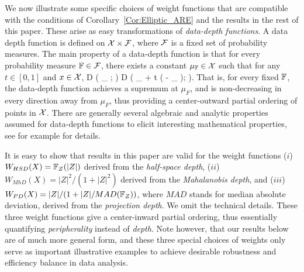 We now illustrate some specific choices of weight functions that are compatible with the 
conditions of Corollary~\ref{Cor:Elliptic_ARE} and the results in the rest of this paper.
 These arise as easy transformations 
of \textit{data-depth functions}. A data depth function 
is defined on $\mathcal{X} \times \mathcal{F}$, where $\mathcal{F}$ is  a fixed set of probability measures.
The main property of a data-depth function is that for every probability measure 
${\mathbb{F}} \in \mathcal{F}$, there exists a constant 
$\mu_{{\mathbb{F}}} \in  \mathcal{X}$ such that for any $t \in [ 0, 1]$ and $x \in \mathcal{X}$,
\baq 
D ( \mu_{\BF} ; \BF ) \geq D ( \mu_{\BF} + t ( \bfx - \mu_{\BF} ); \BF ). 
\label{eq:Peripherality}
\eaq
That is, for every fixed ${\mathbb{F}}$, the data-depth function achieves a supremum at 
$\mu_{F}$, and is non-decreasing in every direction away from $\mu_{F}$, thus providing 
a  center-outward partial ordering of points in $\mathcal{X}$. There are generally several 
algebraic and analytic properties assumed for data-depth functions to elicit interesting 
mathematical properties, see for example 
\cite{ref:AoS00461_ZuoSerfling, ref:DIMACS061_Serfling} 
for details.

It is easy to show that results in this paper are valid for the weight functions
($i$) $W_{HSD} (X) = {\mathbb{F}}_{Z} (| Z |)$ derived from the \textit{half-space depth},  
($ii$) $W_{MhD} (X) = |Z|^{2}/(1 + | Z |^2)$ derived from the \textit{Mahalanobis depth}, 
and  
($iii$) $W_{PD} (X) = |Z|/(1+ | Z |/MAD({\mathbb{F}}_{Z}))$, where $MAD$ stands for median 
absolute deviation, derived from the \textit{projection depth}. We omit the technical 
details. These three weight functions give a center-inward partial ordering, thus essentially 
quantifying \textit{peripherality} instead of \textit{depth}.
Note however, that our results below are of much more general form, and 
these three special choices of weights only serve as important illustrative examples 
to achieve desirable robustness and efficiency balance in data analysis.


